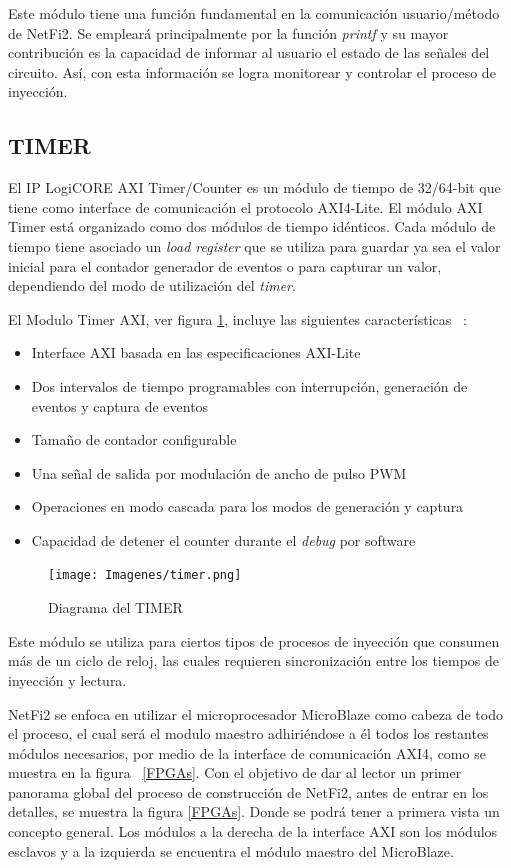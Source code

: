 \documentclass[a4paper,openright,12pt]{report}
\begin{document}
Este módulo tiene una función fundamental en la comunicación usuario/método de NetFi2. Se empleará principalmente por la función \textit{printf} y su mayor contribución es la capacidad de informar al usuario el estado de las señales del circuito. Así, con esta información se logra monitorear y controlar el proceso de inyección.


\subsection{TIMER}
El IP LogiCORE  AXI Timer/Counter es un módulo de tiempo de 32/64-bit que tiene como interface de comunicación el protocolo AXI4-Lite. El módulo AXI Timer  está organizado como dos módulos de tiempo idénticos. Cada módulo de tiempo tiene   asociado un \textit{load register} que se utiliza para guardar ya sea el valor inicial para el contador generador de eventos o para capturar un valor, dependiendo del modo de utilización del \textit{timer}.

El Modulo Timer AXI, ver figura \ref{TIMER}, incluye las siguientes características ~\cite{timer}: 

\begin{itemize}
\item  Interface AXI basada en las especificaciones AXI-Lite
\item  Dos intervalos de tiempo programables con interrupción, generación de eventos y captura de eventos
\item  Tamaño de contador configurable
\item  Una señal de salida por modulación de ancho de pulso PWM
\item Operaciones en modo cascada para los modos de  generación y captura
\item Capacidad de detener el counter durante el \textit{debug} por software
\end{itemize}

\begin{figure}[H]
	\centering
	\texttt{[image: Imagenes/timer.png]}
	\caption{Diagrama del TIMER}
	\label{TIMER}
\end{figure}

Este módulo se utiliza para ciertos tipos de procesos de inyección que consumen más de un ciclo de reloj, las cuales requieren sincronización entre los tiempos de inyección y lectura.


NetFi2 se enfoca en utilizar el microprocesador  MicroBlaze como cabeza de todo el proceso, el cual será el modulo maestro adhiriéndose a él todos los restantes módulos necesarios, por medio de la interface de comunicación AXI4, como se muestra en la figura ~\ref{FPGAs}.
Con el objetivo de dar al lector un primer panorama global del proceso de construcción de  NetFi2, antes de entrar en los detalles, se muestra la figura \ref{FPGAs}.  Donde se podrá tener a primera vista un  concepto general. Los módulos a la derecha de la interface AXI son los módulos esclavos y a la izquierda se encuentra el módulo maestro del MicroBlaze.
\end{document}
